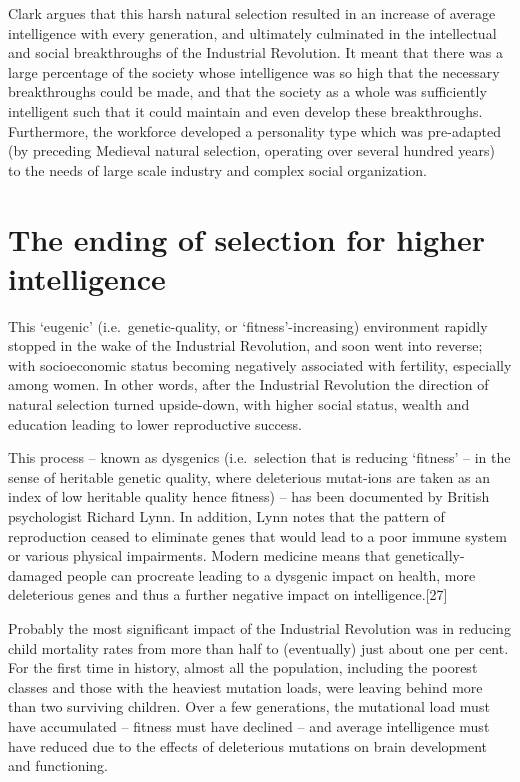\documentclass[
]{book}
\begin{document}
Clark argues that this harsh natural selection resulted in an increase of average intelligence with every generation, and ultimately culminated in the intellectual and social breakthroughs of the Industrial Revolution. It meant that there was a large percentage of the society whose intelligence was so high that the necessary breakthroughs could be made, and that the society as a whole was sufficiently intelligent such that it could maintain and even develop these breakthroughs. Furthermore, the workforce developed a personality type which was pre-adapted (by preceding Medieval natural selection, operating over several hundred years) to the needs of large scale industry and complex social organization.

\hypertarget{the-ending-of-selection-for-higher-intelligence}{%
\section{The ending of selection for higher intelligence}\label{the-ending-of-selection-for-higher-intelligence}}

This `eugenic' (i.e.~genetic-quality, or `fitness'-increasing) environment rapidly stopped in the wake of the Industrial Revolution, and soon went into reverse; with socioeconomic status becoming negatively associated with fertility, especially among women. In other words, after the Industrial Revolution the direction of natural selection turned upside-down, with higher social status, wealth and education leading to lower reproductive success.

This process -- known as dysgenics (i.e.~selection that is reducing `fitness' -- in the sense of heritable genetic quality, where deleterious mutat-ions are taken as an index of low heritable quality hence fitness) -- has been documented by British psychologist Richard Lynn. In addition, Lynn notes that the pattern of reproduction ceased to eliminate genes that would lead to a poor immune system or various physical impairments. Modern medicine means that genetically-damaged people can procreate leading to a dysgenic impact on health, more deleterious genes and thus a further negative impact on intelligence.{[}27{]}

Probably the most significant impact of the Industrial Revolution was in reducing child mortality rates from more than half to (eventually) just about one per cent. For the first time in history, almost all the population, including the poorest classes and those with the heaviest mutation loads, were leaving behind more than two surviving children. Over a few generations, the mutational load must have accumulated -- fitness must have declined -- and average intelligence must have reduced due to the effects of deleterious mutations on brain development and functioning.
\end{document}
